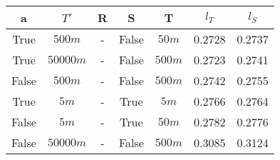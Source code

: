 \begin{tabular}{| c c | c c c | c c |}
\hline
a & $T'$ & R & S & T & $l_T$ & $l_S$ \\
\hline
True & $500m$ & - & False & $50m$ & 0.2728 & 0.2737 \\
True & $50000m$ & - & False & $500m$ & 0.2723 & 0.2741 \\
False & $500m$ & - & False & $500m$ & 0.2742 & 0.2755 \\
True & $5m$ & - & True & $5m$ & 0.2766 & 0.2764 \\
False & $5m$ & - & True & $50m$ & 0.2782 & 0.2776 \\
False & $50000m$ & - & False & $500m$ & 0.3085 & 0.3124 \\
\hline
\end{tabular}
